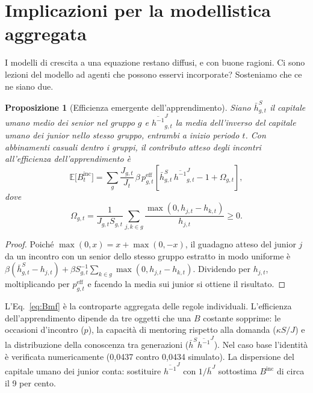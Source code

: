 \documentclass[preprint,12pt,authoryear]{elsarticle}
\newtheorem{proposition}{Proposizione}
\begin{document}
\section{Implicazioni per la modellistica aggregata}\label{sec:aggregate}

I modelli di crescita a una equazione restano diffusi, e con buone ragioni. Ci sono lezioni del modello ad agenti che possono esservi incorporate? Sosteniamo che ce ne siano due.

\begin{proposition}[Efficienza emergente dell'apprendimento]\label{prop:B}
Siano $\bar h^S_{g,t}$ il capitale umano medio dei senior nel gruppo $g$ e $\overline{h^{-1}}^{J}_{g,t}$ la media dell'inverso del capitale umano dei junior nello stesso gruppo, entrambi a inizio periodo $t$. Con abbinamenti casuali dentro i gruppi, il contributo atteso degli incontri all'efficienza dell'apprendimento è
\begin{equation}\label{eq:Bmf}
\mathbb E\big[B^{\mathrm{inc}}_t\big] = \sum_g \frac{J_{g,t}}{J_t}\,\beta\, p^{\mathrm{eff}}_{g,t} \left[\bar h^S_{g,t}\, \overline{h^{-1}}^{J}_{g,t} - 1 + \Omega_{g,t}\right],
\end{equation}
dove
\begin{equation*}
\Omega_{g,t} = \frac{1}{J_{g,t} S_{g,t}}\sum_{j,k\in g}\frac{\max(0,h_{j,t}-h_{k,t})}{h_{j,t}} \ge 0 .
\end{equation*}
\end{proposition}
\begin{proof}
Poiché $\max(0,x) = x + \max(0,-x)$, il guadagno atteso del junior $j$ da un incontro con un senior dello stesso gruppo estratto in modo uniforme è $\beta(\bar h^S_{g,t} - h_{j,t}) + \beta S_{g,t}^{-1}\sum_{k\in g} \max(0, h_{j,t}-h_{k,t})$. Dividendo per $h_{j,t}$, moltiplicando per $p^{\mathrm{eff}}_{g,t}$ e facendo la media sui junior si ottiene il risultato.
\end{proof}

L'Eq.~\eqref{eq:Bmf} è la controparte aggregata delle regole individuali. L'efficienza dell'apprendimento dipende da tre oggetti che una $B$ costante sopprime: le occasioni d'incontro ($p$), la capacità di mentoring rispetto alla domanda ($\kappa S/J$) e la distribuzione della conoscenza tra generazioni ($\bar h^S \overline{h^{-1}}^J$). Nel caso base l'identità è verificata numericamente (0,0437 contro 0,0434 simulato). La dispersione del capitale umano dei junior conta: sostituire $\overline{h^{-1}}^J$ con $1/\bar h^J$ sottostima $B^{\mathrm{inc}}$ di circa il 9 per cento.
\end{document}

